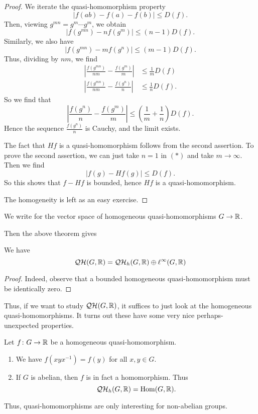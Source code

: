 \documentclass[a4paper]{article}
\newcommand\QH{\mathcal{QH}}
\begin{document}
\begin{proof}
  We iterate the quasi-homomorphism property
  \[
    |f(ab) - f(a) - f(b)| \leq D(f).
  \]
  Then, viewing $g^{mn} = g^m \cdots g^m$, we obtain
  \[
    |f(g^{mn}) - n f(g^m)| \leq (n - 1) D(f).
  \]
  Similarly, we also have
  \[
    |f(g^{mn}) -m f(g^n)| \leq (m - 1) D(f).
  \]
  Thus, dividing by $nm$, we find
  \begin{align*}
    \left|\frac{f(g^{mn})}{nm} - \frac{f(g^m)}{m}\right| &\leq \frac{1}{m} D(f)\\
    \left|\frac{f(g^{mn})}{nm} - \frac{f(g^n)}{n}\right| &\leq \frac{1}{n} D(f).
  \end{align*}
  So we find that
  \[
    \left|\frac{f(g^n)}{n} - \frac{f(g^m)}{m}\right| \leq \left(\frac{1}{m} + \frac{1}{n} \right) D(f).\tag{$*$}
  \]
  Hence the sequence $\frac{f(g^n)}{n}$ is Cauchy, and the limit exists.

  The fact that $Hf$ is a quasi-homomorphism follows from the second assertion. To prove the second assertion, we can just take $n = 1$ in $(*)$ and take $m \to \infty$. Then we find
  \[
    |f(g) - Hf(g)| \leq D(f).
  \]
  So this shows that $f - Hf$ is bounded, hence $Hf$ is a quasi-homomorphism.

  The homogeneity is left as an easy exercise.
\end{proof}

\begin{notation}
  We write \term{$\QH_h(G, \R)$} for the vector space of homogeneous quasi-homomorphisms $G \to \mathbb{R}$.
\end{notation}

Then the above theorem gives
\begin{cor}
  We have
  \[
    \QH(G, \R) = \QH_h(G, \R) \oplus \ell^\infty(G, \R)
  \]
\end{cor}

\begin{proof}
  Indeed, observe that a bounded homogeneous quasi-homomorphism must be identically zero.
\end{proof}

Thus, if we want to study $\QH(G, \R)$, it suffices to just look at the homogeneous quasi-homomorphisms. It turns out these have some very nice perhaps-unexpected properties.
\begin{lemma}
  Let $f\colon G \to \mathbb{R}$ be a homogeneous quasi-homomorphism.
  \begin{enumerate}
    \item We have $f(xyx^{-1}) = f(y)$ for all $x, y \in G$.
    \item If $G$ is abelian, then $f$ is in fact a homomorphism. Thus
      \[
        \QH_h(G, \R) = \Hom(G, \R).
      \]
  \end{enumerate}
\end{lemma}
Thus, quasi-homomorphisms are only interesting for non-abelian groups.
\end{document}
